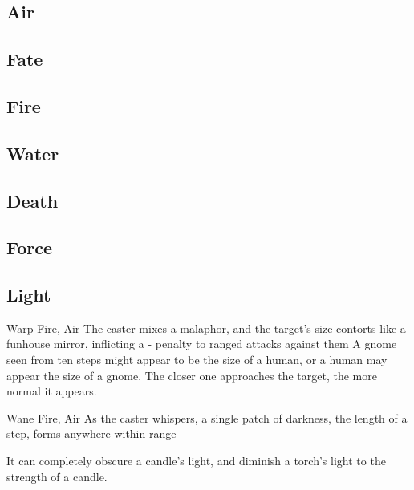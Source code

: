 \begin{multicols}{2}

\subsection{Air}


\subsection{Fate}


\subsection{Fire}


\subsection{Water}


\subsection{Death}


\subsection{Force}


\subsection{Light}

  {}%
  {Warp}%
  {Fire, Air}%
  {}%
  {The caster mixes a malaphor, and the target's size contorts like a funhouse mirror, inflicting a - penalty to ranged attacks against them}%
  {A gnome seen from ten steps might appear to be the size of a human, or a human may appear the size of a gnome.
    The closer one approaches the target, the more normal it appears.}


  {}%
  {Wane}%
  {Fire, Air}%
  {}%
  {As the caster whispers, a single patch of darkness, the length of a step, forms anywhere within range}%
  {It can completely obscure a candle's light, and diminish a torch's light to the strength of a candle.

}
\end{multicols}
